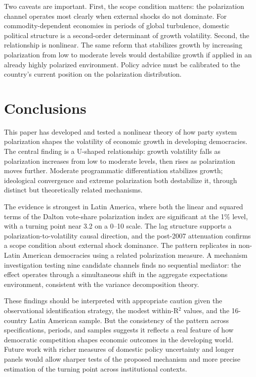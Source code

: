 \documentclass[12pt]{article}
\begin{document}
Two caveats are important. First, the scope condition matters: the
polarization channel operates most clearly when external shocks do not
dominate. For commodity-dependent economies in periods of global turbulence,
domestic political structure is a second-order determinant of growth
volatility. Second, the relationship is nonlinear. The same reform that
stabilizes growth by increasing polarization from low to moderate levels
would destabilize growth if applied in an already highly polarized
environment. Policy advice must be calibrated to the country's current
position on the polarization distribution.

\section{Conclusions}

This paper has developed and tested a nonlinear theory of how party system
polarization shapes the volatility of economic growth in developing
democracies. The central finding is a U-shaped relationship: growth
volatility falls as polarization increases from low to moderate levels, then
rises as polarization moves further. Moderate programmatic differentiation
stabilizes growth; ideological convergence and extreme polarization both
destabilize it, through distinct but theoretically related mechanisms.

The evidence is strongest in Latin America, where both the linear and
squared terms of the Dalton vote-share polarization index are significant at
the 1\% level, with a turning point near 3.2 on a 0--10 scale. The lag
structure supports a polarization-to-volatility causal direction, and the
post-2007 attenuation confirms a scope condition about external shock
dominance. The pattern replicates in non-Latin American democracies using
a related polarization measure. A mechanism investigation testing nine
candidate channels finds no sequential mediator: the effect operates through
a simultaneous shift in the aggregate expectations environment, consistent
with the variance decomposition theory.

These findings should be interpreted with appropriate caution given the
observational identification strategy, the modest within-R$^2$ values, and
the 16-country Latin American sample. But the consistency of the pattern
across specifications, periods, and samples suggests it reflects a real
feature of how democratic competition shapes economic outcomes in the
developing world. Future work with richer measures of domestic policy
uncertainty and longer panels would allow sharper tests of the proposed
mechanism and more precise estimation of the turning point across
institutional contexts.

\newpage


\end{document}
